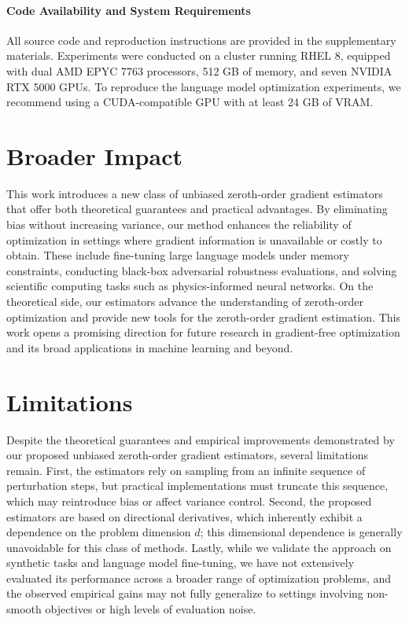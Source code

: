 \documentclass{article}
\theoremstyle{definition}
\theoremstyle{plain}
\theoremstyle{remark}
\begin{document}
\paragraph{Code Availability and System Requirements}
All source code and reproduction instructions are provided in the supplementary materials. Experiments were conducted on a cluster running RHEL 8, equipped with dual AMD EPYC 7763 processors, 512 GB of memory, and seven NVIDIA RTX 5000 GPUs. To reproduce the language model optimization experiments, we recommend using a CUDA-compatible GPU with at least 24 GB of VRAM.



\section{Broader Impact}\label{appendix:braoder-impact}
This work introduces a new class of unbiased zeroth-order gradient estimators that offer both theoretical guarantees and practical advantages. By eliminating bias without increasing variance, our method enhances the reliability of optimization in settings where gradient information is unavailable or costly to obtain. These include fine-tuning large language models under memory constraints, conducting black-box adversarial robustness evaluations, and solving scientific computing tasks such as physics-informed neural networks. On the theoretical side, our estimators advance the understanding of zeroth-order optimization and provide new tools for the zeroth-order gradient estimation. This work opens a promising direction for future research in gradient-free optimization and its broad applications in machine learning and beyond.
 
\section{Limitations}\label{appendix:limitations}
Despite the theoretical guarantees and empirical improvements demonstrated by our proposed unbiased zeroth-order gradient estimators, several limitations remain. First, the estimators rely on sampling from an infinite sequence of perturbation steps, but practical implementations must truncate this sequence, which may reintroduce bias or affect variance control. Second, the proposed estimators are based on directional derivatives, which inherently exhibit a dependence on the problem dimension $d$; this dimensional dependence is generally unavoidable for this class of methods. Lastly, while we validate the approach on synthetic tasks and language model fine-tuning, we have not extensively evaluated its performance across a broader range of optimization problems, and the observed empirical gains may not fully generalize to settings involving non-smooth objectives or high levels of evaluation noise.

\end{document}
